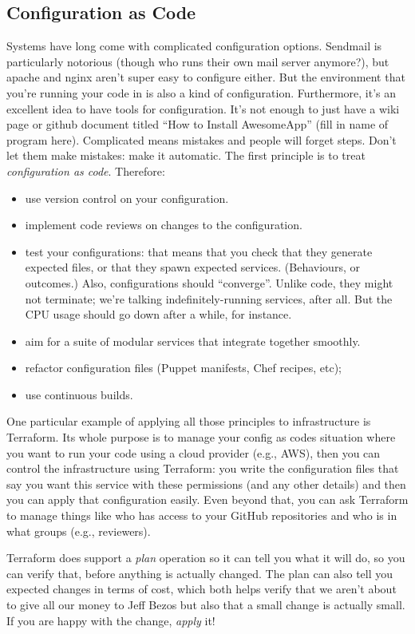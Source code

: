 \subsection*{Configuration as Code}
Systems have long come with complicated configuration options. 
Sendmail is particularly notorious (though who runs their own mail server anymore?), but apache and nginx aren't super
easy to configure either. But the environment that you're running your code in is also a kind of configuration. Furthermore, it's an excellent idea to have tools for configuration. It's not enough to just have a wiki page or github document titled ``How to Install AwesomeApp'' (fill in name of program here). Complicated means mistakes and people will forget steps. Don't let them make mistakes: make it automatic. The first principle is to treat \emph{configuration as code}. 
Therefore:
\begin{itemize}
\item use version control on your configuration.
\item implement code reviews on changes to the configuration.
\item test your configurations: that means that you check that they
  generate expected files, or that they spawn expected
  services. (Behaviours, or outcomes.) Also, configurations should
  ``converge''. Unlike code, they might not terminate; we're talking
  indefinitely-running services, after all. But the CPU usage should
  go down after a while, for instance.
\item aim for a suite of modular services that integrate together smoothly.
\item refactor configuration files (Puppet manifests, Chef recipes, etc);
\item use continuous builds.
\end{itemize}

One particular example of applying all those principles to infrastructure
is Terraform. Its whole purpose is to manage your config as codes
situation where you want to run your code using a cloud provider (e.g., AWS), 
then you can control the infrastructure using Terraform: you write the
configuration files that say you want this service with these permissions
(and any other details) and then you can apply that configuration easily. 
Even beyond that, you can ask Terraform to manage things like who has access
to your GitHub repositories and who is in what groups (e.g., reviewers).

Terraform does support a \emph{plan} operation so it can tell you what it will
do, so you can verify that, before anything is actually changed. The plan can also tell you expected changes in terms of cost, which both helps verify that we aren't about to give all our money to Jeff Bezos but also that a small change is actually small. If you are happy with the change, \emph{apply} it! 

